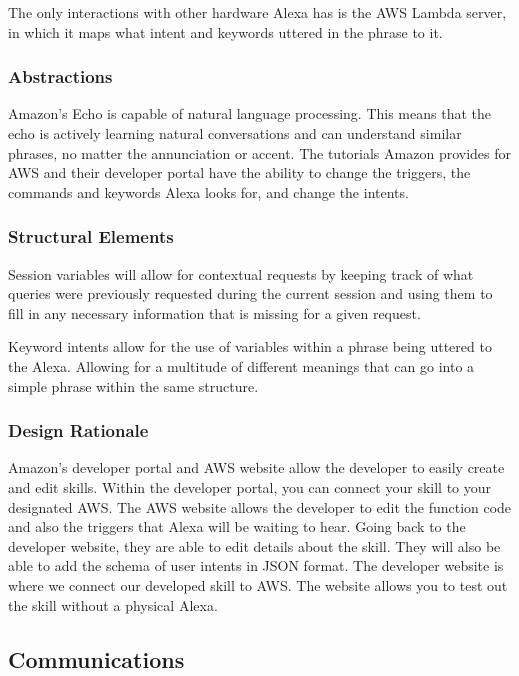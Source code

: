 \documentclass[onecolumn, draftclsnofoot,10pt, compsoc]{IEEEtran}
\begin{document}
            The only interactions with other hardware Alexa has is the AWS Lambda server, in which it maps what intent and keywords uttered in the phrase to it.

        \subsubsection{Abstractions}
            Amazon{'}s Echo is capable of natural language processing. This means that the echo is actively learning natural conversations and can understand similar phrases, no matter the annunciation or accent. The tutorials Amazon provides for AWS and their developer portal have the ability to change the triggers, the commands and keywords Alexa looks for, and change the intents.

        
        \subsubsection{Structural Elements}
            Session variables will allow for contextual requests by keeping track of what queries were previously requested during the current session and using them to fill in any necessary information that is missing for a given request.
            
            Keyword intents allow for the use of variables within a phrase being uttered to the Alexa. Allowing for a multitude of different meanings that can go into a simple phrase within the same structure.  

        \subsubsection{Design Rationale}
            Amazon{'}s developer portal and AWS website allow the developer to easily create and edit skills. Within the developer portal, you can connect your skill to your designated AWS. The AWS website allows the developer to edit the function code and also the triggers that Alexa will be waiting to hear. Going back to the developer website, they are able to edit details about the skill. They will also be able to add the schema of user intents in JSON format. The developer website is where we connect our developed skill to AWS. The website allows you to test out the skill without a physical Alexa.
        
    \subsection{Communications}
\end{document}
